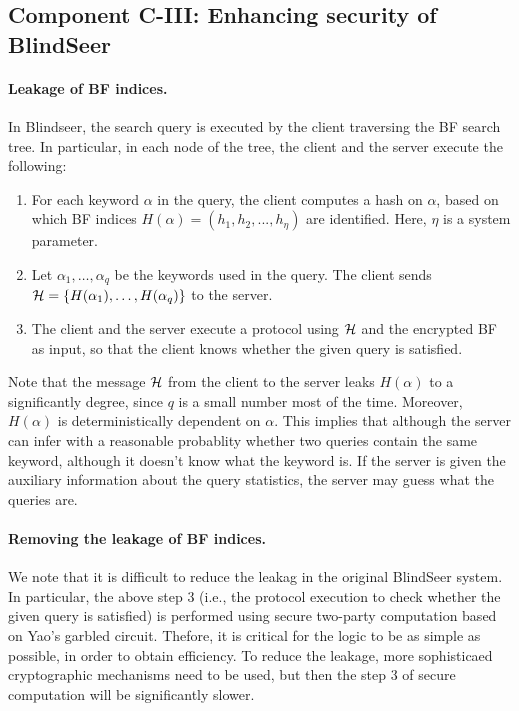 \def\HHH{{\cal H}}
\subsection{Component C-III: Enhancing security of BlindSeer}

\paragraph{Leakage of BF indices.}
In Blindseer, the search query is executed by the client traversing the BF
search tree. In particular, in each node of the tree, the client and the server
execute the following:

\begin{enumerate}
\item For each keyword $\alpha$ in the query, the client computes a hash on
$\alpha$, based on which BF indices $H(\alpha) =  (h_1, h_2, ..., h_\eta)$
are identified. Here, $\eta$ is a system parameter. 

\item Let $\alpha_1, \ldots, \alpha_q$ be the keywords used in the query.  The
  client sends $\HHH = \{H(\alpha_1), \ldots, H(\alpha_q)\}$ to the server. 

\item The client and the server execute a protocol using $\HHH$ and the
encrypted BF as input, so that the client knows whether the given query is
satisfied. 
\end{enumerate}

Note that the message $\HHH$ from the client to the server leaks $H(\alpha)$ to
a significantly degree, since $q$ is a small number most of the time. Moreover,
$H(\alpha)$ is deterministically dependent on $\alpha$. This implies that
although the server can infer with a reasonable probablity whether two queries
contain the same keyword, although it doesn't know what the keyword is.  If the
server is given the auxiliary information about the query statistics, the
server may guess what the queries are. 

\paragraph{Removing the leakage of BF indices.}

We note that it is difficult to reduce the leakag in the original
BlindSeer system. In particular, the above step 3 (i.e., the protocol execution
to check whether the given query is satisfied) is performed using secure
two-party computation based on Yao's garbled circuit. Thefore, it is critical
for the logic to be as simple as possible, in order to obtain efficiency. To
reduce the leakage, more sophisticaed cryptographic mechanisms need to be used,
but then the step 3 of secure computation will be significantly slower. 

